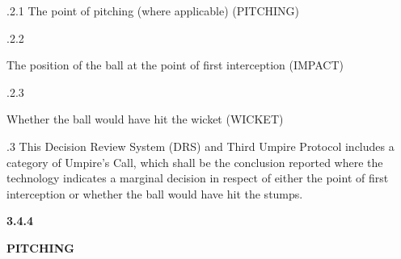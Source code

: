 \documentclass[12pt]{article}
\begin{document}
\vspace{\baselineskip}
\begin{adjustwidth}{0.49in}{0.0in}
{\fontsize{9pt}{10.8pt}.2.1 \tabto{1.17in} The point of pitching (where applicable) (PITCHING)\par}\par

\end{adjustwidth}


\vspace{\baselineskip}
\begin{adjustwidth}{0.49in}{0.0in}
{\fontsize{9pt}{10.8pt}.2.2 \tabto{1.17in} {\fontsize{8pt}{9.6pt}\selectfont The position of the ball at the point of first interception (IMPACT)\par}\par}\par

\end{adjustwidth}


\vspace{\baselineskip}
\begin{adjustwidth}{0.49in}{0.0in}
{\fontsize{9pt}{10.8pt}.2.3 \tabto{1.17in} {\fontsize{8pt}{9.6pt}\selectfont Whether the ball would have hit the wicket (WICKET)\par}\par}\par

\end{adjustwidth}


\vspace{\baselineskip}
\begin{adjustwidth}{0.5in}{0.14in}
\begin{justify}
{\fontsize{9pt}{10.8pt}.3 \tabto{0.49in} This Decision Review System (DRS) and Third Umpire Protocol includes a category of Umpire’s Call, which shall be the conclusion reported where the technology indicates a marginal decision in respect of either the point of first interception or whether the ball would have hit the stumps.\par}
\end{justify}\par

\end{adjustwidth}


\vspace{\baselineskip}
{\fontsize{9pt}{10.8pt}\selectfont \textbf{3.4.4 \tabto{0.49in} }{\fontsize{8pt}{9.6pt}\selectfont \textbf{PITCHING}\par}\par}\par
\end{document}
